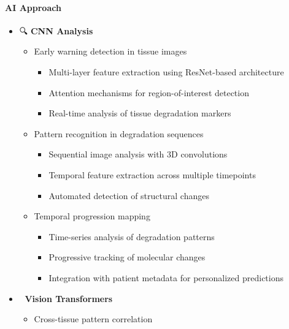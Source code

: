 \paragraph{AI Approach}\label{ai-approach}

\begin{itemize}
\item
  🔍 \textbf{CNN Analysis}

  \begin{itemize}
  \tightlist
  \item
    Early warning detection in tissue images

    \begin{itemize}
    \tightlist
    \item
      Multi-layer feature extraction using ResNet-based architecture
    \item
      Attention mechanisms for region-of-interest detection
    \item
      Real-time analysis of tissue degradation markers
    \end{itemize}
  \item
    Pattern recognition in degradation sequences

    \begin{itemize}
    \tightlist
    \item
      Sequential image analysis with 3D convolutions
    \item
      Temporal feature extraction across multiple timepoints
    \item
      Automated detection of structural changes
    \end{itemize}
  \item
    Temporal progression mapping

    \begin{itemize}
    \tightlist
    \item
      Time-series analysis of degradation patterns
    \item
      Progressive tracking of molecular changes
    \item
      Integration with patient metadata for personalized predictions
    \end{itemize}
  \end{itemize}
\item
  🤖 \textbf{Vision Transformers}

  \begin{itemize}
  \tightlist
  \item
    Cross-tissue pattern correlation


\end{itemize}
\end{itemize}
